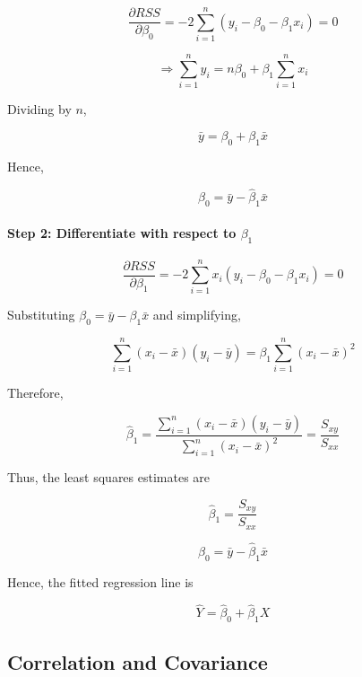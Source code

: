 \documentclass[10pt,a4paper]{article}
\begin{document}
\begin{itemize}
	\[
	\frac{\partial RSS}{\partial \beta_0}
	=
	-2\sum_{i=1}^{n}(y_i-\beta_0-\beta_1x_i)=0
	\]
	
	\[
	\Rightarrow
	\sum_{i=1}^{n} y_i
	=
	n\beta_0+\beta_1\sum_{i=1}^{n}x_i
	\]
	
	Dividing by \(n\),
	
	\[
	\bar{y} = \beta_0 + \beta_1\bar{x}
	\]
	
	Hence,
	
	\[
	\hat{\beta}_0 = \bar{y} - \hat{\beta}_1\bar{x}
	\]
	
	\paragraph{Step 2: Differentiate with respect to \(\beta_1\)}
	
	\[
	\frac{\partial RSS}{\partial \beta_1}
	=
	-2\sum_{i=1}^{n}x_i(y_i-\beta_0-\beta_1x_i)=0
	\]
	
	Substituting
	\(
	\beta_0=\bar{y}-\beta_1\bar{x}
	\)
	and simplifying,
	
	\[
	\sum_{i=1}^{n}(x_i-\bar{x})(y_i-\bar{y})
	=
	\beta_1
	\sum_{i=1}^{n}(x_i-\bar{x})^2
	\]
	
	Therefore,
	
	\[
	\hat{\beta}_1
	=
	\frac{\sum_{i=1}^{n}(x_i-\bar{x})(y_i-\bar{y})}
	{\sum_{i=1}^{n}(x_i-\bar{x})^2}
	=
	\frac{S_{xy}}{S_{xx}}
	\]
	
	Thus, the least squares estimates are
	
	\[
	\boxed{
	\hat{\beta}_1
	=
	\frac{S_{xy}}{S_{xx}}
	}
	\]
	
	\[
	\boxed{
	\hat{\beta}_0
	=
	\bar{y}-\hat{\beta}_1\bar{x}
	}
	\]
	
	Hence, the fitted regression line is
	
	\[
	\hat{Y} = \hat{\beta}_0 + \hat{\beta}_1 X
	\]

	\end{itemize}

	\subsection{Correlation and Covariance}
	
\end{document}

